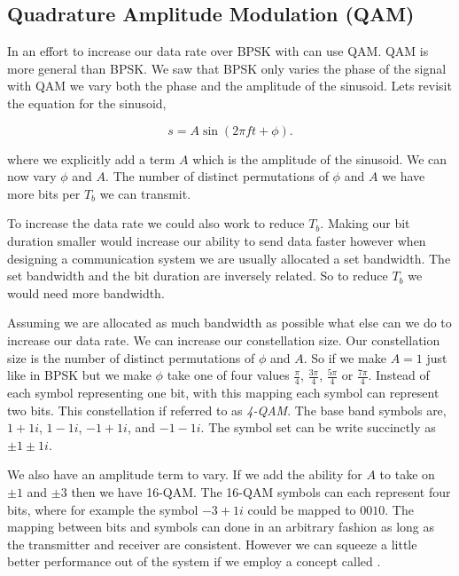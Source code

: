 \subsection{Quadrature Amplitude Modulation (QAM)}

In an effort to increase our data rate over \ac{BPSK} with can use \ac{QAM}. \ac{QAM} is more general than \ac{BPSK}. We saw that \ac{BPSK} only varies the phase of the signal with \ac{QAM} we vary both the phase and the amplitude of the sinusoid. Lets revisit the equation for the sinusoid,

\begin{equation}
s = A\sin\left(2\pi ft + \phi\right).
\end{equation}
	
\noindent

where we explicitly add a term $A$ which is the amplitude of the sinusoid. We can now vary $\phi$ and $A$. The number of distinct permutations of $\phi$ and $A$ we have more bits per $T_b$ we can transmit.

To increase the data rate we could also work to reduce $T_b$. Making our bit duration smaller would increase our ability to send data faster however when designing a communication system we are usually allocated a set bandwidth. The set bandwidth and the bit duration are inversely related. So to reduce $T_b$ we would need more bandwidth.

Assuming we are allocated as much bandwidth as possible what else can we do to increase our data rate. We can increase our constellation size. Our constellation size is the number of distinct permutations of $\phi$ and $A$. So if we make $A=1$ just like in \ac{BPSK} but we make $\phi$ take one of four values $\frac{\pi}{4}$, $\frac{3\pi}{4}$, $\frac{5\pi}{4}$ or $\frac{7\pi}{4}$. Instead of each symbol representing one bit, with this mapping each symbol can represent two bits. This constellation if referred to as \emph{4-\ac{QAM}}. The base band symbols are, $1+1i$, $1-1i$, $-1+1i$, and $-1-1i$. The symbol set can be write succinctly as $\pm1\pm1i$.

We also have an amplitude term to vary. If we add the ability for $A$ to take on $\pm1$ and $\pm3$ then we have 16-\ac{QAM}. The 16-\ac{QAM} symbols can each represent four bits, where for example the symbol $-3+1i$ could be mapped to $0010$. The mapping between bits and symbols can done in an arbitrary fashion as long as the transmitter and receiver are consistent. However we can squeeze a little better performance out of the system if we employ a concept called \emph{}.

